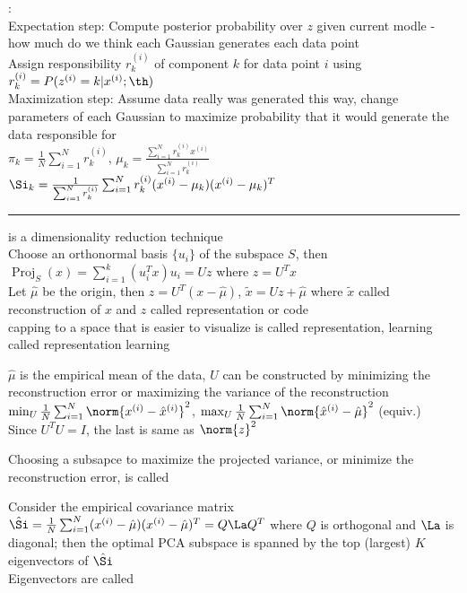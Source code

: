 \documentclass[10pt]{CheatSheet/hw}
\begin{document}
\begin{multicols*}{5}
:\\
Expectation step: Compute posterior probability over $z$ given current modle - how much do we think each Gaussian generates each data point\\
Assign responsibility $r_k^{(i)}$ of component $k$ for data point $i$ using $r_k^{(i)}=P(z^{(i)}=k|x^{(i)};\th)$\\
Maximization step: Assume data really was generated this way, change parameters of each Gaussian to maximize probability that it would generate the data responsible for\\
$\pi_k = \frac1N\sum_{i=1}^N r_k^{(i)}$, $\mu_k=\frac{\sum_{i=1}^N r_k^{(i)}x^{(i)}}{\sum_{i=1}^N r_k^{(i)}}$\\
$\Si_k=\frac1{\sum_{i=1}^N r_k^{(i)}}\sum_{i=1}^N r_k^{(i)}(x^{(i)}-\mu_k)(x^{(i)}-\mu_k)^T$\\
\rule{\linewidth}{0.4pt}

 is a  dimensionality reduction technique\\
Choose an orthonormal basis $\{u_i\}$ of the subspace $S$, then $\operatorname{Proj}_S(x)=\sum_{i=1}^k (u_i^Tx)u_i=Uz$ where $z=U^T x$\\
Let $\hat{\mu}$ be the origin, then $z=U^T(x-\hat{\mu})$, $\tilde{x}=Uz+\hat{\mu}$ where $\tilde{x}$ called reconstruction of $x$ and $z$ called representation or code\\
capping to a space that is easier to visualize is called representation, learning called representation learning

$\hat{\mu}$ is the empirical mean of the data, $U$ can be constructed by minimizing the reconstruction error or maximizing the variance of the reconstruction $\min_U \frac1N\sum_{i=1}^N\norm{x^{(i)}-\hat{x}^{(i)}}^2$, $\max_U \frac1N\sum_{i=1}^N\norm{\hat{x}^{(i)}-\hat{\mu}}^2$ (equiv.)\\
Since $U^TU=I$, the last is same as $\norm{z}^2$

Choosing a subsapce to maximize the projected variance, or minimize the reconstruction error, is called  

Consider the empirical covariance matrix $\hat{\Si}=\frac1N\sum_{i=1}^N(x^{(i)}-\hat{\mu})(x^{(i)}-\hat{\mu})^T=Q\La Q^T$ where $Q$ is orthogonal and $\La$ is diagonal; then the optimal PCA subspace is spanned by the top (largest) $K$ eigenvectors of $\hat{\Si}$\\
Eigenvectors are called 


\end{multicols*}
\end{document}
